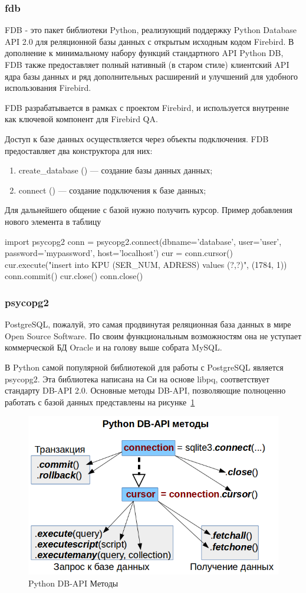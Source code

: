 \subsubsection{fdb}
FDB - это пакет библиотеки Python, реализующий поддержку Python Database API 2.0 для реляционной базы данных с открытым исходным кодом Firebird. В дополнение к минимальному набору функций стандартного API Python DB, FDB также предоставляет полный нативный (в старом стиле) клиентский API ядра базы данных и ряд дополнительных расширений и улучшений для удобного использования Firebird.\cite{fdb}

FDB разрабатывается в рамках с проектом Firebird, и используется внутренне как ключевой компонент для Firebird QA.\cite{firebird}

Доступ к базе данных осуществляется через объекты подключения. FDB предоставляет два конструктора для них:
\begin{enumerate}
	\item create\_database () --- создание базы данных данных;
	\item connect () --- создание подключения к базе данных;
\end{enumerate}
Для дальнейшего общение с базой нужно получить курсор. Пример добавления нового элемента в таблицу
\begin{MyCode}
import psycopg2
conn = psycopg2.connect(dbname='database', user='user', 
password='mypassword', host='localhost')
cur = conn.cursor()
cur.execute("insert into KPU (SER\_NUM, ADRESS) values (?,?)",
		(1784, 1))
conn.commit()
cur.close()
conn.close()
\end{MyCode}
\subsubsection{psycopg2}
PostgreSQL, пожалуй, это самая продвинутая реляционная база данных в мире Open Source Software. По своим функциональным возможностям она не уступает коммерческой БД Oracle и на голову выше собрата MySQL.\cite{psycopg}

В Python самой популярной библиотекой для работы с PostgreSQL является psycopg2. Эта библиотека написана на Си на основе libpq, соответствует стандарту DB-API 2.0. Основные методы DB-API, позволяющие полноценно работать с базой данных представлены на рисунке~\ref{fig:pythondb-api}

\begin{figure}[H]
	\centering
	\includegraphics[width=0.7\linewidth]{pics/pythonDB-API}
	\caption{Python DB-API Методы}
	\label{fig:pythondb-api}
\end{figure}
 


